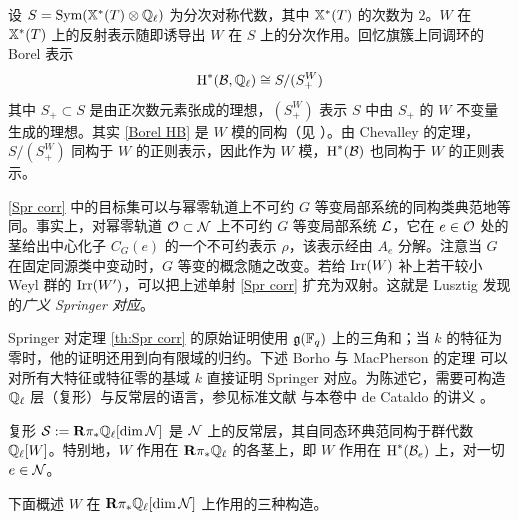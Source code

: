 设 $S=\textup{Sym}(\mathbb{X}^*(T)\otimes\mathbb{Q}_{\ell})$ 为分次对称代数，其中 $\mathbb{X}^*(T)$ 的次数为 $2$。$W$ 在 $\mathbb{X}^*(T)$ 上的反射表示随即诱导出 $W$ 在 $S$ 上的分次作用。回忆旗簇上同调环的 Borel 表示
\begin{equation}\label{Borel HB}
\textup{H}^{*}({\mathcal{B},\mathbb{Q}_{\ell}})\cong S/(S^{W}_{+})
\end{equation}
其中 $S_{+}\subset S$ 是由正次数元素张成的理想，$(S^{W}_{+})$ 表示 $S$ 中由 $S_{+}$ 的 $W$ 不变量生成的理想。其实 \eqref{Borel HB} 是 $W$ 模的同构（见 \cite[Prop 7.2]{Springer}）。由 Chevalley 的定理，$S/(S^{W}_{+})$ 同构于 $W$ 的正则表示，因此作为 $W$ 模，$\textup{H}^{*}({\mathcal{B}})$ 也同构于 $W$ 的正则表示。

\begin{remark} \eqref{Spr corr} 中的目标集可以与幂零轨道上不可约 $G$ 等变局部系统的同构类典范地等同。事实上，对幂零轨道 $\mathcal{O}\subset\mathcal{N}$ 上不可约 $G$ 等变局部系统 $\mathcal{L}$，它在 $e\in\mathcal{O}$ 处的茎给出中心化子 $C_{G}(e)$ 的一个不可约表示 $\rho$，该表示经由 $A_{e}$ 分解。注意当 $G$ 在固定同源类中变动时，$G$ 等变的概念随之改变。若给 $\textup{Irr}(W)$ 补上若干较小 Weyl 群的 $\textup{Irr}(W')$，可以把上述单射 \eqref{Spr corr} 扩充为双射。这就是 Lusztig \cite{LuIC} 发现的{\em 广义 Springer 对应}。
\end{remark}

Springer 对定理 \ref{th:Spr corr} 的原始证明使用 $\mathfrak{g}(\mathbb{F}_{q})$ 上的三角和；当 $k$ 的特征为零时，他的证明还用到向有限域的归约。下述 Borho 与 MacPherson 的定理 \cite{BM} 可以对所有大特征或特征零的基域 $k$ 直接证明 Springer 对应。为陈述它，需要可构造 $\mathbb{Q}_{\ell}$ 层（复形）与反常层的语言，参见标准文献 \cite{BBD} 与本卷中 de Cataldo 的讲义 \cite{dC}。

\begin{theorem}\label{th:BM} 复形 $\mathcal{S}:=\mathbf{R}\pi_{*}\mathbb{Q}_{\ell}[\dim\mathcal{N}]$ 是 $\mathcal{N}$ 上的反常层，其自同态环典范同构于群代数 $\mathbb{Q}_{\ell}[W]$。特别地，$W$ 作用在 $\mathbf{R}\pi_{*}\mathbb{Q}_{\ell}$ 的各茎上，即 $W$ 作用在 $\textup{H}^{*}({\mathcal{B}_{e}})$ 上，对一切 $e\in\mathcal{N}$。
\end{theorem}

下面概述 $W$ 在 $\mathbf{R}\pi_{*}\mathbb{Q}_{\ell}[\dim\mathcal{N}]$ 上作用的三种构造。

